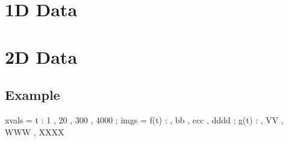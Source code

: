 \documentclass[12pt]{article}
\begin{document}


\section{1D Data}

\section{2D Data}

\subsection{Example \thesubsection}

\begin{functable}
    xvals =    t : 1 , 20 , 300 , 4000 ;
    imgs  = f(t) :  , bb , ccc , dddd ;
            g(t) :  , VV , WWW , XXXX
\end{functable}


%


%
%
%
%
%
%
%


%
%
%
\end{document}
